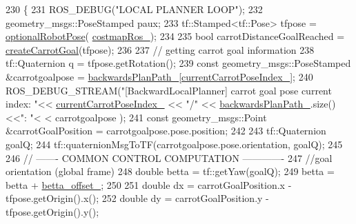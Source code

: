 \begin{DoxyCode}
230         \{
231             ROS\_DEBUG(\textcolor{stringliteral}{"LOCAL PLANNER LOOP"});
232             geometry\_msgs::PoseStamped paux;
233             tf::Stamped<tf::Pose> tfpose = \hyperlink{namespacecl__move__base__z_1_1backward__local__planner_afd5bb2a0d144f7b89f4215fbcb1fbe69}{optionalRobotPose}(
      \hyperlink{classcl__move__base__z_1_1backward__local__planner_1_1BackwardLocalPlanner_a4136268882a105d9e06e173d85d5c0dc}{costmapRos\_});
234 
235             \textcolor{keywordtype}{bool} carrotDistanceGoalReached = \hyperlink{classcl__move__base__z_1_1backward__local__planner_1_1BackwardLocalPlanner_a786337a838e58b38b724bc342cf76e10}{createCarrotGoal}(tfpose);
236 
237             \textcolor{comment}{// getting carrot goal information}
238             tf::Quaternion q = tfpose.getRotation();
239             \textcolor{keyword}{const} geometry\_msgs::PoseStamped &carrotgoalpose = 
      \hyperlink{classcl__move__base__z_1_1backward__local__planner_1_1BackwardLocalPlanner_ad9cde5c85f782cab2ddb4030e3c3f2cf}{backwardsPlanPath\_}[\hyperlink{classcl__move__base__z_1_1backward__local__planner_1_1BackwardLocalPlanner_a2e8f2b78bc97f27c5fa431f3af2261ed}{currentCarrotPoseIndex\_}];
240             ROS\_DEBUG\_STREAM(\textcolor{stringliteral}{"[BackwardLocalPlanner] carrot goal pose current index: "}<< 
      \hyperlink{classcl__move__base__z_1_1backward__local__planner_1_1BackwardLocalPlanner_a2e8f2b78bc97f27c5fa431f3af2261ed}{currentCarrotPoseIndex\_} << \textcolor{stringliteral}{"/"} << \hyperlink{classcl__move__base__z_1_1backward__local__planner_1_1BackwardLocalPlanner_ad9cde5c85f782cab2ddb4030e3c3f2cf}{backwardsPlanPath\_}.size()<<\textcolor{stringliteral}{": "}<
      < carrotgoalpose );
241             \textcolor{keyword}{const} geometry\_msgs::Point &carrotGoalPosition = carrotgoalpose.pose.position;
242 
243             tf::Quaternion goalQ;
244             tf::quaternionMsgToTF(carrotgoalpose.pose.orientation, goalQ);
245 
246             \textcolor{comment}{// ------- COMMON CONTROL COMPUTATION -------------}
247             \textcolor{comment}{//goal orientation (global frame)}
248             \textcolor{keywordtype}{double} betta = tf::getYaw(goalQ);
249             betta = betta + \hyperlink{classcl__move__base__z_1_1backward__local__planner_1_1BackwardLocalPlanner_a07e5f16f6951cca1e6d3483f345d0bb1}{betta\_offset\_};
250 
251             \textcolor{keywordtype}{double} dx = carrotGoalPosition.x - tfpose.getOrigin().x();
252             \textcolor{keywordtype}{double} dy = carrotGoalPosition.y - tfpose.getOrigin().y();

\end{DoxyCode}
